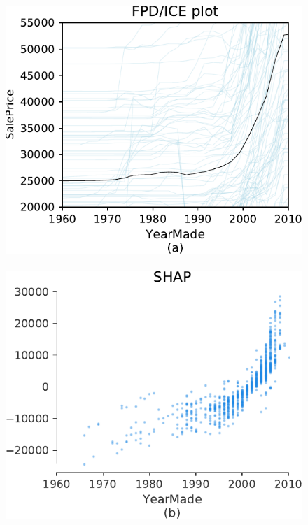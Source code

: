 \documentclass{article}
\newcommand{\cut}[1]{}
\begin{document}
\cut{
pregnant female at max range [233.33467678]
pregnant female in male height range [228.71359869]
nonpregnant female in male height range [209.88006493]
male in male height range [219.46772083]
}


\cut{
$1/n*\sum_{i=1}^n f(x_j = pregnant, x_{i, \bar{j}}) - f(x_j = not pregnant, x_{i, \bar{j}})$

\noindent where ${x_{i, \bar{j}}: i=1,2,?,n}$ are the n training observations of $x_{\bar{j}}$
}

\begin{figure}[htbp]
\begin{center}
\includegraphics[scale=0.35]{images/bulldozer_YearMade_pdp.pdf}~~
\includegraphics[scale=0.35]{images/bulldozer_YearMade_shap.pdf}~~

\end{center}
\end{figure}
\end{document}
